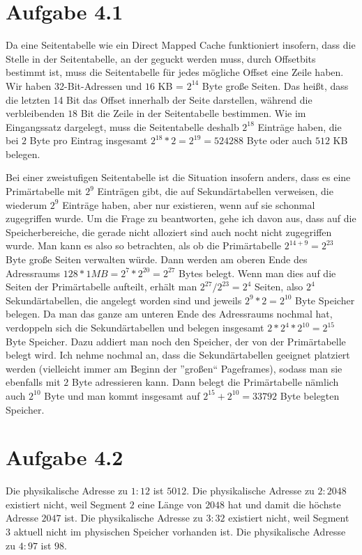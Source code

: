 \documentclass[10pt,a4paper]{article}
\begin{document}
\section*{Aufgabe 4.1}

Da eine Seitentabelle wie ein Direct Mapped Cache funktioniert insofern, dass die Stelle in der Seitentabelle, an der geguckt werden muss, durch Offsetbits bestimmt ist, muss die Seitentabelle für jedes mögliche Offset eine Zeile haben.
Wir haben 32-Bit-Adressen und $16$ KB = $2^{14}$ Byte große Seiten.
Das heißt, dass die letzten 14 Bit das Offset innerhalb der Seite darstellen, während die verbleibenden $18$ Bit die Zeile in der Seitentabelle bestimmen.
Wie im Eingangssatz dargelegt, muss die Seitentabelle deshalb $2^{18}$ Einträge haben, die bei $2$ Byte pro Eintrag insgesamt $2^{18} * 2 = 2^{19} = 524288$ Byte oder auch $512$ KB belegen.

Bei einer zweistufigen Seitentabelle ist die Situation insofern anders, dass es eine Primärtabelle mit $2^{9}$ Einträgen gibt, die auf Sekundärtabellen verweisen, die wiederum $2^{9}$ Einträge haben, aber nur existieren, wenn auf sie schonmal zugegriffen wurde.
Um die Frage zu beantworten, gehe ich davon aus, dass auf die Speicherbereiche, die gerade nicht alloziert sind auch nocht nicht zugegriffen wurde.
Man kann es also so betrachten, als ob die Primärtabelle $2^{14 + 9} = 2^{23}$ Byte große Seiten verwalten würde.
Dann werden am oberen Ende des Adressraums $128 * 1MB = 2^{7} * 2^{20} = 2^{27}$ Bytes belegt.
Wenn man dies auf die Seiten der Primärtabelle aufteilt, erhält man $2^{27} / 2^{23} = 2^{4}$ Seiten, also $2^{4}$ Sekundärtabellen, die angelegt worden sind und jeweils $2^{9} * 2 = 2^{10}$ Byte Speicher belegen.
Da man das ganze am unteren Ende des Adressraums nochmal hat, verdoppeln sich die Sekundärtabellen und belegen insgesamt $2 * 2^{4} * 2^{10} = 2^{15}$ Byte Speicher.
Dazu addiert man noch den Speicher, der von der Primärtabelle belegt wird.
Ich nehme nochmal an, dass die Sekundärtabellen geeignet platziert werden (vielleicht immer am Beginn der ''großen`` Pageframes), sodass man sie ebenfalls mit $2$ Byte adressieren kann.
Dann belegt die Primärtabelle nämlich auch $2^{10}$ Byte und man kommt insgesamt auf $2^{15} + 2^{10} = 33792$ Byte belegten Speicher.

\section*{Aufgabe 4.2}

Die physikalische Adresse zu $1:12$ ist $5012$.
Die physikalische Adresse zu $2:2048$ existiert nicht, weil Segment $2$ eine Länge von $2048$ hat und damit die höchste Adresse $2047$ ist.
Die physikalische Adresse zu $3:32$ existiert nicht, weil Segment $3$ aktuell nicht im physischen Speicher vorhanden ist.
Die physikalische Adresse zu $4:97$ ist $98$.
\end{document}
